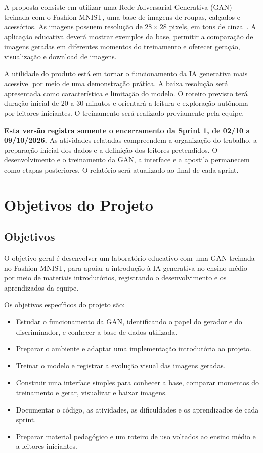 \documentclass[12pt,a4paper]{article}
\begin{document}
A proposta consiste em utilizar uma Rede Adversarial Generativa (GAN) treinada com o Fashion-MNIST, uma base de imagens de roupas, calçados e acessórios. As imagens possuem resolução de $28\times28$ pixels, em tons de cinza~\cite{fashionmnist}. A aplicação educativa deverá mostrar exemplos da base, permitir a comparação de imagens geradas em diferentes momentos do treinamento e oferecer geração, visualização e download de imagens.

A utilidade do produto está em tornar o funcionamento da IA generativa mais acessível por meio de uma demonstração prática. A baixa resolução será apresentada como característica e limitação do modelo. O roteiro previsto terá duração inicial de 20 a 30 minutos e orientará a leitura e exploração autônoma por leitores iniciantes. O treinamento será realizado previamente pela equipe.

\textbf{Esta versão registra somente o encerramento da Sprint 1, de 02/10 a 09/10/2026.} As atividades relatadas compreendem a organização do trabalho, a preparação inicial dos dados e a definição dos leitores pretendidos. O desenvolvimento e o treinamento da GAN, a interface e a apostila permanecem como etapas posteriores. O relatório será atualizado ao final de cada sprint.


\section{Objetivos do Projeto}
\subsection{Objetivos}
O objetivo geral é desenvolver um laboratório educativo com uma GAN treinada no Fashion-MNIST, para apoiar a introdução à IA generativa no ensino médio por meio de materiais introdutórios, registrando o desenvolvimento e os aprendizados da equipe.

Os objetivos específicos do projeto são:
\begin{itemize}
\item Estudar o funcionamento da GAN, identificando o papel do gerador e do discriminador, e conhecer a base de dados utilizada.
\item Preparar o ambiente e adaptar uma implementação introdutória ao projeto.
\item Treinar o modelo e registrar a evolução visual das imagens geradas.
\item Construir uma interface simples para conhecer a base, comparar momentos do treinamento e gerar, visualizar e baixar imagens.
\item Documentar o código, as atividades, as dificuldades e os aprendizados de cada sprint.
\item Preparar material pedagógico e um roteiro de uso voltados ao ensino médio e a leitores iniciantes.
\end{itemize}
\end{document}
